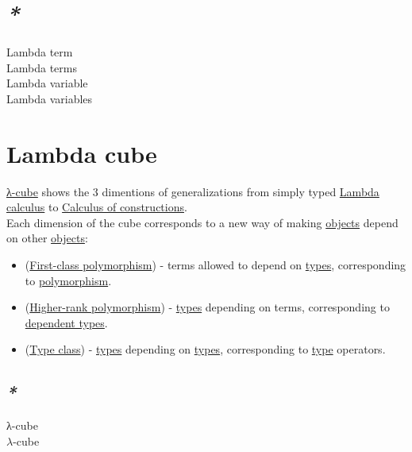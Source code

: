 \documentclass[a4paper,14pt,oneside]{book}
\begin{document}
\section{\emph{*}}
\label{sec:org00b8dda}

\label{org6ddeb8c}Lambda term\\
\label{orgf52d00b}Lambda terms\\
\label{org764c4ba}Lambda variable\\
\label{orgcac4947}Lambda variables\\

\section{\label{orgcbb96be}Lambda cube}
\label{sec:org90b163e}
\hyperref[org4f5e942]{λ-cube} shows the 3 dimentions of generalizations from simply typed \hyperref[org0f9cd10]{Lambda calculus} to \hyperref[org92c7527]{Calculus of constructions}.\\

Each dimension of the cube corresponds to a new way of making \hyperref[org22f7883]{objects} depend on other \hyperref[org22f7883]{objects}:\\
\begin{itemize}
\item (\hyperref[org4a8c97c]{First-class polymorphism}) - terms allowed to depend on \hyperref[org9e7edc9]{types}, corresponding to \hyperref[org578fb61]{polymorphism}.\\
\item (\hyperref[org9db595b]{Higher-rank polymorphism}) - \hyperref[org9e7edc9]{types} depending on terms, corresponding to \hyperref[org35cde12]{dependent types}.\\
\item (\hyperref[org904b85b]{Type class}) - \hyperref[org9e7edc9]{types} depending on \hyperref[org9e7edc9]{types}, corresponding to \hyperref[orgd6db20c]{type} operators.\\
\end{itemize}

\subsection{\emph{*}}
\label{sec:org0efe2b9}

\label{org4f5e942}λ-cube\\
\label{org7383e76}\(\lambda\)-cube\\
\end{document}
